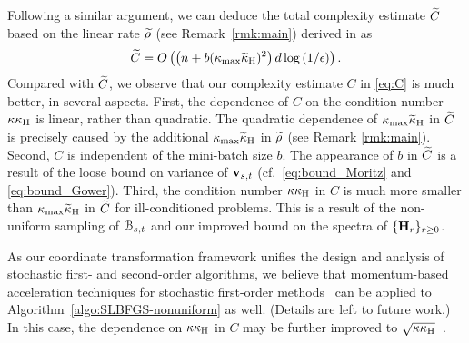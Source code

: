 \documentclass[10pt,twocolumn,journal]{IEEEtran}
\begin{document}
\begin{remark}\label{rmk:complexity}
Following a similar argument, we can deduce the total complexity estimate $\widetilde{C}$ based on the linear rate $\widetilde{\rho}$ (see Remark~\ref{rmk:main}) derived in \cite{Moritz_16} as%
\begin{equation}
\widetilde{C}=O\left(\left(n+b(\kappa_{\max}\widetilde{\kappa}_{\mathrm{H}})^2\right)d\log\left({1}/{\epsilon}\right)\right).\label{eq:tilC}
\end{equation}
Compared with $\widetilde{C}$, we observe that our complexity estimate $C$ in \eqref{eq:C} is much better, in several aspects. First, the dependence of $C$ on the condition number $\kappa\kappa_{\mathrm{H}}$ is linear, rather than quadratic. The quadratic dependence of $\kappa_{\max}\widetilde{\kappa}_{\mathrm{H}}$ in $\widetilde{C}$ is precisely caused by the additional $\kappa_{\max}\widetilde{\kappa}_{\mathrm{H}}$ in $\widetilde{\rho}$ (see Remark \ref{rmk:main}). 
Second, $C$ is independent of the mini-batch size $b$. The appearance of $b$ in $\widetilde{C}$ is a result of the loose bound on variance of $\mathbf{v}_{s,t}$ (cf.\ \eqref{eq:bound_Moritz} and \eqref{eq:bound_Gower}). Third, the condition number $\kappa\kappa_{\mathrm{H}}$ in $C$ is much more smaller than $\kappa_{\max}\widetilde{\kappa}_{\mathrm{H}}$ in $\widetilde{C}$ for ill-conditioned problems. This is a result of the non-uniform sampling of $\mathcal{B}_{s,t}$ and our improved bound on the spectra of $\{\mathbf{H}_r\}_{r\ge 0}$. %
\end{remark}

\begin{remark}
As our coordinate transformation framework unifies the design and analysis of stochastic first- and second-order algorithms, we believe that momentum-based acceleration techniques for stochastic first-order methods~\cite{Lin_15,Allen_Zhu_16} can be applied to Algorithm~\ref{algo:SLBFGS-nonuniform} as well. (Details are left to future work.) In this case, the dependence on $\kappa\kappa_{\mathrm{H}}$ in $C$ may be further improved to $\sqrt{\kappa\kappa_{\mathrm{H}}}$~\cite{Allen_Zhu_16}. 
\end{remark}
\end{document}
